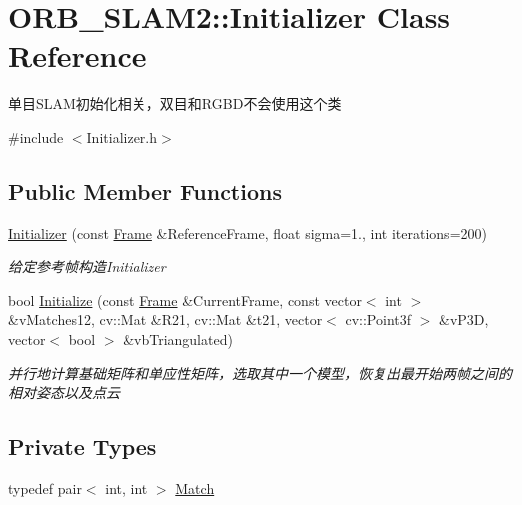 \hypertarget{class_o_r_b___s_l_a_m2_1_1_initializer}{}\section{O\+R\+B\+\_\+\+S\+L\+A\+M2\+:\+:Initializer Class Reference}
\label{class_o_r_b___s_l_a_m2_1_1_initializer}


单目\+S\+L\+A\+M初始化相关，双目和\+R\+G\+B\+D不会使用这个类  




{\ttfamily \#include $<$Initializer.\+h$>$}

\subsection*{Public Member Functions}
\begin{DoxyCompactItemize}
\item 
\mbox{\hyperlink{class_o_r_b___s_l_a_m2_1_1_initializer_ac492345a970665cd8a1b1d8cf41d44af}{Initializer}} (const \mbox{\hyperlink{class_o_r_b___s_l_a_m2_1_1_frame}{Frame}} \&Reference\+Frame, float sigma=1., int iterations=200)
\begin{DoxyCompactList}\small\item\em 给定参考帧构造\+Initializer \end{DoxyCompactList}\item 
bool \mbox{\hyperlink{class_o_r_b___s_l_a_m2_1_1_initializer_a40d41840e2bdb7199ab024871d028c2c}{Initialize}} (const \mbox{\hyperlink{class_o_r_b___s_l_a_m2_1_1_frame}{Frame}} \&Current\+Frame, const vector$<$ int $>$ \&v\+Matches12, cv\+::\+Mat \&R21, cv\+::\+Mat \&t21, vector$<$ cv\+::\+Point3f $>$ \&v\+P3D, vector$<$ bool $>$ \&vb\+Triangulated)
\begin{DoxyCompactList}\small\item\em 并行地计算基础矩阵和单应性矩阵，选取其中一个模型，恢复出最开始两帧之间的相对姿态以及点云 \end{DoxyCompactList}\end{DoxyCompactItemize}
\subsection*{Private Types}
\begin{DoxyCompactItemize}
\item 
typedef pair$<$ int, int $>$ \mbox{\hyperlink{class_o_r_b___s_l_a_m2_1_1_initializer_ad0bf21297bc6271e7d014ce41d6ff7d4}{Match}}
\end{DoxyCompactItemize}
